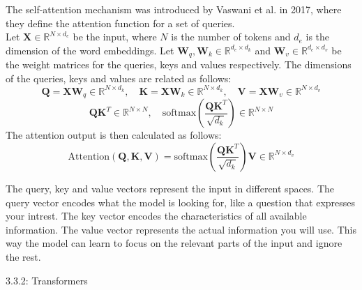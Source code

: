 The self-attention mechanism was introduced by Vaswani et al. in 2017, where they define the
attention function for a set of queries.\\
Let $\mathbf{X} \in \mathbb{R}^{N \times d_e}$ be the input, where $N$ is the number of tokens and
$d_e$ is the dimension of the word embeddings. Let $\mathbf{W}_q, \mathbf{W}_k \in \mathbb{R}^{d_e
    \times d_k}$ and $\mathbf{W}_v \in \mathbb{R}^{d_e \times d_v}$ be the weight matrices for the
queries, keys and values respectively. The dimensions of the queries, keys and values are related as
follows:
\begin{equation}
  \mathbf{Q} = \mathbf{X} \mathbf{W}_q \in \mathbb{R}^{N \times d_k}, \quad
  \mathbf{K} = \mathbf{X} \mathbf{W}_k \in \mathbb{R}^{N \times d_k}, \quad
  \mathbf{V} = \mathbf{X} \mathbf{W}_v \in \mathbb{R}^{N \times d_v}
\end{equation}
\begin{equation}
  \mathbf{Q} \mathbf{K}^T \in \mathbb{R}^{N \times N}, \quad
  \text{softmax}\left( \frac{\mathbf{Q} \mathbf{K}^T}{\sqrt{d_k}} \right) \in \mathbb{R}^{N \times N}
\end{equation}
The attention output is then calculated as follows:
\begin{equation}
  \text{Attention}(\mathbf{Q}, \mathbf{K}, \mathbf{V}) = \text{softmax}\left( \frac{\mathbf{Q}
    \mathbf{K}^T}{\sqrt{d_k}} \right) \mathbf{V} \in \mathbb{R}^{N \times d_v}
\end{equation}

The query, key and value vectors represent the input in different spaces. The query vector encodes
what the model is looking for, like a question that expresses your intrest. The key vector encodes
the characteristics of all available information. The value vector represents the actual
information you will use. This way the model can learn to focus on the relevant parts of the input
and ignore the rest.



\begin{task}{3.3.2: Transformers}
\end{task}

